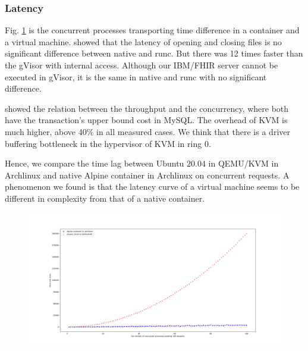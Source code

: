 \subsubsection{Latency}
Fig. \ref{conc} is the concurrent processes transporting time
difference in a container and a virtual machine.
\textcite{234857} showed that the latency of opening and closing files
is no significant difference between native and runc. But there was 12 times
faster than the gVisor with internal access. Although our IBM/FHIR server
cannot be executed in gVisor, it is the same in native and runc with no
significant difference.

\textcite{7095802} showed the relation between the throughput and the concurrency,
where both have the transaction's upper bound cost in MySQL. The overhead of KVM is
much higher, above 40\% in all measured cases. We think that there is a driver
buffering bottleneck in the hypervisor of KVM in ring 0.

Hence, we compare the time lag between Ubuntu 20.04 in QEMU/KVM in Archlinux
and native Alpine container in Archlinux on concurrent requests.
A phenomenon we found is that the latency curve of a virtual
machine seems to be different in complexity from that of a native container.

\begin{figure}
    \centering
    \includegraphics[width=.5\textwidth]{src/concurrent.png}
    \label{conc}
\end{figure}
